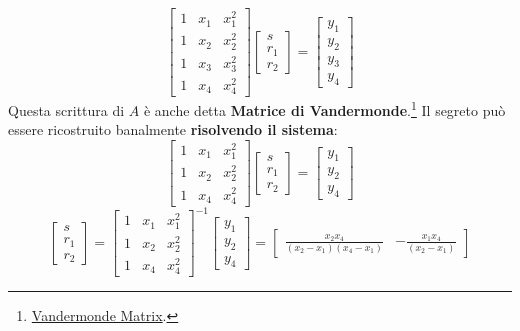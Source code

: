 \begin{example}
\[\begin{bmatrix}
    1 & x_1 & x_1^2\\
    1 & x_2 & x_2^2\\
    1 & x_3 & x_3^2\\
    1 & x_4 & x_4^2
\end{bmatrix}
\begin{bmatrix}
    s\\
    r_1\\
    r_2
\end{bmatrix}=
\begin{bmatrix}
    y_1\\
    y_2\\
    y_3\\
    y_4
\end{bmatrix}\]
Questa scrittura di $A$ è anche detta \textbf{Matrice di Vandermonde}.\footnote{\href{https://it.wikipedia.org/wiki/Matrice_di_Vandermonde}{Vandermonde Matrix}.}
Il segreto può essere ricostruito banalmente \textbf{risolvendo il sistema}:
\[
\begin{bmatrix}
  1 & x_1 & x_1^2\\
  1 & x_2 & x_2^2\\
  1 & x_4 & x_4^2    
\end{bmatrix}\begin{bmatrix}
    s\\
    r_1\\
    r_2
\end{bmatrix}=\begin{bmatrix}
    y_1\\
    y_2\\
    y_4
\end{bmatrix}
\]
\[
\begin{bmatrix}
    s\\
    r_1\\
    r_2
\end{bmatrix}=
\begin{bmatrix}
  1 & x_1 & x_1^2\\
  1 & x_2 & x_2^2\\
  1 & x_4 & x_4^2    
\end{bmatrix}^{-1}
\begin{bmatrix}
    y_1\\
    y_2\\
    y_4
\end{bmatrix}=
\begin{bmatrix}
      \frac{x_2 x_4}{(x_2 - x_1)  (x_4 - x_1)} & - \frac{x_1 x_4}{(x_2 - x_1) 
}
\end{bmatrix}\]
\end{example}
